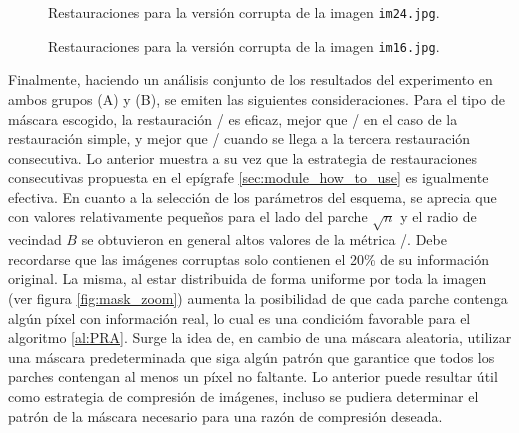 
\begin{figure}[h]
	\centering
	\caption{Restauraciones para la versi\'on corrupta de la imagen \texttt{im24.jpg}.}
	\label{fig:im24.jpg}
\end{figure}

\begin{figure}[h]
	\centering
	\caption{Restauraciones para la versi\'on corrupta de la imagen \texttt{im16.jpg}.}
	\label{fig:im16.jpg}
\end{figure}

Finalmente, haciendo un an\'alisis conjunto de los resultados del experimento en ambos grupos (A) y (B), se emiten las siguientes consideraciones. Para el tipo de m\'ascara escogido, la restauraci\'on \SOP/ es eficaz, mejor que \TELEA/ en el caso de la restauraci\'on simple, y mejor que \NS/ cuando se llega a la tercera restauraci\'on consecutiva. Lo anterior muestra a su vez que la estrategia de restauraciones consecutivas propuesta en el ep\'igrafe \ref{sec:module_how_to_use} es igualmente efectiva. En cuanto a la selecci\'on de los par\'ametros del esquema, se aprecia que con valores relativamente pequeños para el lado del parche $\sqrt{n}$ y el radio de vecindad $B$ se obtuvieron en general altos valores de la m\'etrica \PSNR/. Debe recordarse que las im\'agenes corruptas solo contienen el 20\% de su informaci\'on original. La misma, al estar distribuida de forma uniforme por toda la imagen (ver figura \ref{fig:mask_zoom}) aumenta la posibilidad de que cada parche contenga alg\'un p\'ixel con informaci\'on real, lo cual es una condici\'om favorable para el algoritmo \ref{al:PRA}. Surge la idea de, en cambio de una m\'ascara aleatoria, utilizar una m\'ascara predeterminada que siga alg\'un patr\'on que garantice que todos los parches contengan al menos un p\'ixel no faltante. Lo anterior puede resultar \'util como estrategia de compresi\'on de im\'agenes, incluso se pudiera determinar el patr\'on de la m\'ascara necesario para una raz\'on de compresi\'on deseada.

